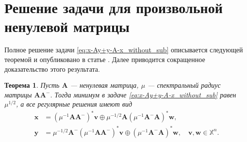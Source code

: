\documentclass[specialist,
               substylefile = spbu.rtx,
               subf,href,colorlinks=true, 12pt]{disser}
\newtheorem{theorem}{Теорема}
\theoremstyle{definition}
\begin{document}
\section{Решение задачи для произвольной ненулевой матрицы}\label{sec:SAM}
Полное решение задачи \eqref{eq:x-Ay+y-A-x_without_sub} описывается следующей теоремой и опубликовано в статье \cite{Krivulin2018Rankone}. Далее приводится сокращенное доказательство этого результата.
\begin{theorem}
\label{th:without_sub}
Пусть $\bm{A}$ --- ненулевая матрица, $\mu$ --- спектральный радиус матрицы $\bm{A}\bm{A}^{-}$. 
Тогда минимум в задаче \eqref{eq:x-Ay+y-A-x_without_sub} равен $\mu^{1/2}$, а все регулярные решения имеют вид
\begin{equation}\label{eq:solution_without_sub}
\begin{aligned}
\bm{x}
&=
(\mu^{-1}\bm{A}\bm{A}^{-})^{\ast}\bm{v}
\oplus
\mu^{-1/2}\bm{A}(\mu^{-1}\bm{A}^{-}\bm{A})^{\ast}\bm{w},
\\
\bm{y}
&=
\mu^{-1/2}\bm{A}^{-}(\mu^{-1}\bm{A}\bm{A}^{-})^{\ast}\bm{v}
\oplus
(\mu^{-1}\bm{A}^{-}\bm{A})^{\ast}\bm{w},
\quad
\bm{v}, \bm{w}\in\mathbb{X}^{n}.
\end{aligned}
\end{equation}
\end{theorem}
\end{document}
